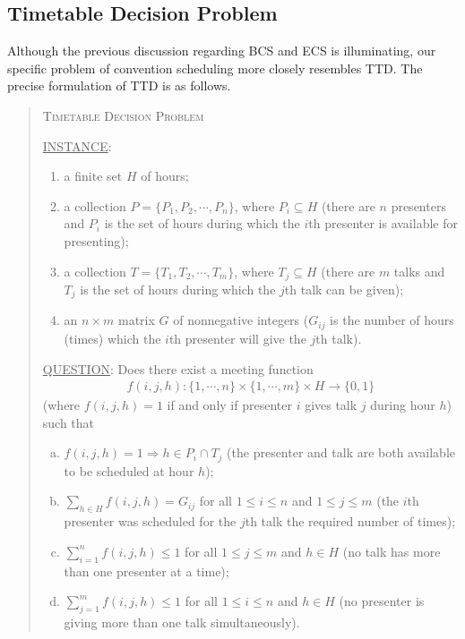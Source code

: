 \documentclass[]{article}
\theoremstyle{definition}
\theoremstyle{remark}
\numberwithin{equation}{section}
\begin{document}
\subsection{Timetable Decision Problem}
Although the previous discussion regarding BCS and ECS is illuminating, our specific problem of convention scheduling more closely resembles TTD. The precise formulation of TTD is as follows.
\begin{quote}
	\textsc{Timetable Decision Problem}
	
	\underline{INSTANCE}:
	\begin{enumerate}
		\item a finite set $H$ of hours;
		\item a collection $P = \{P_1, P_2, \cdots, P_n\}$, where $P_i \subseteq H$ (there are $n$ presenters and $P_i$ is the set of hours during which the $i$th presenter is available for presenting);
		\item a collection $T = \{T_1, T_2, \cdots, T_m\}$, where $T_j \subseteq H$ (there are $m$ talks and $T_j$ is the set of hours during which the $j$th talk can be given);
		\item an $n \times m$ matrix $G$ of nonnegative integers ($G_{ij}$ is the number of hours (times) which the $i$th presenter will give the $j$th talk).
	\end{enumerate}
	\underline{QUESTION}: Does there exist a meeting function 
	\begin{gather*}
		f(i,j,h) : \{1,\cdots,n\} \times \{1,\cdots,m\} \times H \rightarrow \{0,1\}
	\end{gather*}
	(where $f(i,j,h)=1$ if and only if presenter $i$ gives talk $j$ during hour $h$) such that
	\begin{enumerate}[(a)]
		\item $f(i,j,h) = 1 \Rightarrow h \in P_i \cap T_j$ (the presenter and talk are both available to be scheduled at hour $h$);
		\item $\sum\limits_{h \in H} f(i,j,h) = G_{ij}$ for all $1 \le i \le n$ and $1 \le j \le m$ (the $i$th presenter was scheduled for the $j$th talk the required number of times);
		\item $\sum\limits_{i=1}^n f(i,j,h) \le 1$ for all $1 \le j \le m$ and $h \in H$ (no talk has more than one presenter at a time);
		\item $\sum\limits_{j=1}^m f(i,j,h) \le 1$ for all $1 \le i \le n$ and $h \in H$ (no presenter is giving more than one talk simultaneously).
	\end{enumerate}
\end{quote}
\end{document}
